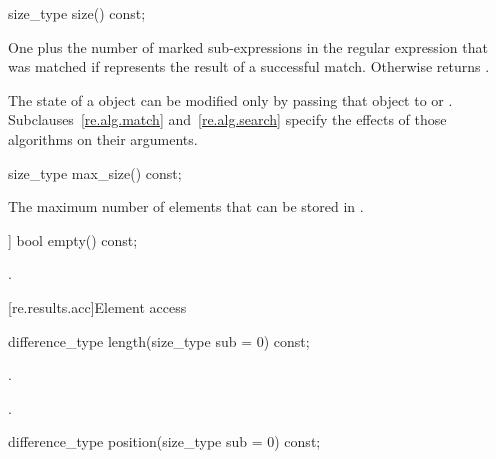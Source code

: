 %
\begin{itemdecl}
size_type size() const;
\end{itemdecl}

\begin{itemdescr}
\pnum\returns One plus the number of marked sub-expressions in the
regular expression that was matched if  represents the
result of a successful match.  Otherwise returns .
\begin{note} The state of a  object can be modified
only by passing that object to  or .
Subclauses~\ref{re.alg.match} and~\ref{re.alg.search} specify the
effects of those algorithms on their  arguments.
\end{note}
\end{itemdescr}

%
\begin{itemdecl}
size_type max_size() const;
\end{itemdecl}

\begin{itemdescr}
\pnum\returns The maximum number of  elements that can be
stored in .
\end{itemdescr}

%
\begin{itemdecl}
[[nodiscard]] bool empty() const;
\end{itemdecl}

\begin{itemdescr}
\pnum\returns {}.
\end{itemdescr}

[re.results.acc]{Element access}

%
\begin{itemdecl}
difference_type length(size_type sub = 0) const;
\end{itemdecl}

\begin{itemdescr}
\pnum
\requires {}.

\pnum
\returns {}.
\end{itemdescr}

%
\begin{itemdecl}
difference_type position(size_type sub = 0) const;
\end{itemdecl}

